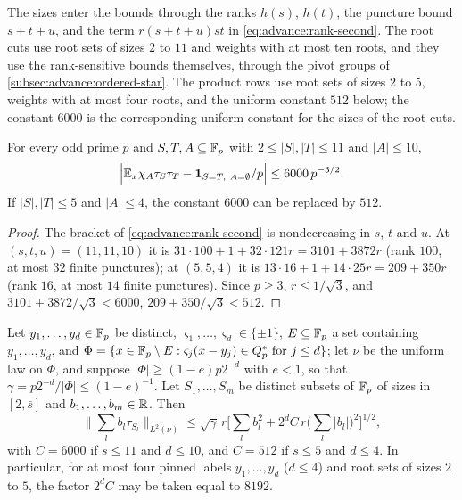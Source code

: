 The sizes enter the bounds through the ranks $h(s)$, $h(t)$, the puncture bound $s+t+u$, and the term $r(s+t+u)st$ in \eqref{eq:advance:rank-second}. The root cuts use root sets of sizes $2$ to $11$ and
weights with at most ten roots, and they use the rank-sensitive bounds
themselves, through the pivot groups of \cref{subsec:advance:ordered-star}. The
product rows use root sets of sizes $2$ to $5$, weights with at most four
roots, and the uniform constant $512$ below; the constant $6000$ is the
corresponding uniform constant for the sizes of the root cuts.

\begin{corollary}\label{cor:moving-root-uniform}
For every odd prime $p$ and $S,T,A\subseteq\mathbb F_p$ with $2\le|S|,|T|\le11$ and
$|A|\le10$,
\[
  \Big|\E_x\chi_A\tau_S\tau_T-\frac{\one_{S=T,\ A=\emptyset}}p\Big|\le6000\,p^{-3/2}.
\]
If $|S|,|T|\le5$ and $|A|\le4$, the constant $6000$ can be replaced by $512$.
\end{corollary}

\begin{proof}
The bracket of \eqref{eq:advance:rank-second} is nondecreasing in $s$, $t$ and
$u$. At $(s,t,u)=(11,11,10)$ it is $31\cdot100+1+32\cdot121r=3101+3872r$
(rank $100$, at most $32$ finite punctures); at $(5,5,4)$ it is
$13\cdot16+1+14\cdot25r=209+350r$ (rank $16$, at most $14$ finite punctures).
Since $p\ge3$, $r\le1/\sqrt3$, and $3101+3872/\sqrt3<6000$,
$209+350/\sqrt3<512$.
\end{proof}

\begin{corollary}\label{cor:moving-root-conditional}
Let $y_1,\dots,y_d\in\mathbb F_p$ be distinct, $\varsigma_1,\dots,\varsigma_d\in\{\pm1\}$,
$E\subseteq\mathbb F_p$ a set containing $y_1,\dots,y_d$, and
$\Phi=\{x\in\mathbb F_p\setminus E:\varsigma_j(x-y_j)\in Q_{p}^{*}\ \text{for}\ j\le d\}$; let
$\nu$ be the uniform law on $\Phi$, and suppose $|\Phi|\ge(1-e)p2^{-d}$ with
$e<1$, so that $\gamma=p2^{-d}/|\Phi|\le(1-e)^{-1}$. Let $S_1,\dots,S_m$ be
distinct subsets of $\mathbb F_p$ of sizes in $[2,\bar s]$ and $b_1,\dots,b_m\in\mathbb R$.
Then
\[
  \Big\|\sum_lb_l\tau_{S_l}\Big\|_{L^2(\nu)}
  \le\sqrt\gamma\,r\Big[\sum_lb_l^2+2^dC\,r\Big(\sum_l|b_l|\Big)^2\Big]^{1/2},
\]
with $C=6000$ if $\bar s\le11$ and $d\le10$, and $C=512$ if $\bar s\le5$ and
$d\le4$. In particular, for at most four pinned labels
$y_1,\dots,y_d$ ($d\le4$) and root sets of sizes $2$ to $5$,
the factor $2^dC$ may be taken equal to $8192$.
\end{corollary}

